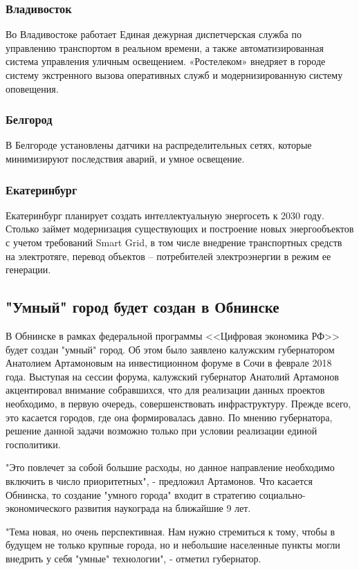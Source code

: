 \subsubsection{Владивосток}
Во Владивостоке работает Единая дежурная диспетчерская служба по управлению транспортом в реальном времени, а также автоматизированная система управления уличным освещением. «Ростелеком» внедряет в городе систему экстренного вызова оперативных служб и модернизированную систему оповещения.
\subsubsection{Белгород}
В Белгороде установлены датчики на распределительных сетях, которые минимизируют последствия аварий, и умное освещение.
\subsubsection{Екатеринбург}
Екатеринбург планирует создать интеллектуальную энергосеть к 2030 году. Столько займет модернизация существующих и построение новых энергообъектов с учетом требований Smart Grid, в том числе внедрение транспортных средств на электротяге, перевод объектов – потребителей электроэнергии в режим ее генерации.

\subsection{"Умный" город будет создан в Обнинске}
В Обнинске в рамках федеральной программы <<Цифровая экономика РФ>> будет создан "умный" город. Об этом было заявлено калужским губернатором Анатолием Артамоновым на инвестиционном форуме в Сочи в феврале 2018 года.\cite{smartcityObn}
Выступая на сессии форума, калужский губернатор Анатолий Артамонов акцентировал внимание собравшихся, что для реализации данных проектов необходимо, в первую очередь, совершенствовать инфраструктуру. Прежде всего, это касается городов, где она формировалась давно. По мнению губернатора, решение данной задачи возможно только при условии реализации единой госполитики. 

"Это повлечет за собой большие расходы, но данное направление необходимо включить в число приоритетных", - предложил Артамонов. Что касается Обнинска, то создание "умного города" входит в стратегию социально-экономического развития наукограда на ближайшие 9 лет. 

"Тема новая, но очень перспективная. Нам нужно стремиться к тому, чтобы в будущем не только крупные города, но и небольшие населенные пункты могли внедрить у себя "умные" технологии", - отметил губернатор. 

